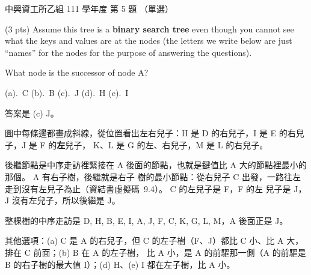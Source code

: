 \begin{pastexam}[label={px:nchu-111-is-05}]{中興資工所乙組 111 學年度 第 5 題}
（單選）

(3 pts) Assume this tree is a \textbf{binary search tree} even though you cannot see what the keys and values
are at the nodes (the letters we write below are just ``names'' for the nodes for the purpose of answering the
questions).

\begin{center}
\end{center}

What node is the successor of node A?

(a).~C \qquad (b).~B \qquad (c).~J \qquad (d).~H \qquad (e).~I
\end{pastexam}

\begin{pastsoln}
答案是 (c) J。

圖中每條邊都畫成斜線，從位置看出左右兒子：H 是 D 的右兒子，I 是 E 的右兒子，J 是 F 的\textbf{左}兒子，
K、L 是 G 的左、右兒子，M 是 L 的右兒子。

後繼節點是中序走訪裡緊接在 A 後面的節點，也就是鍵值比 A 大的節點裡最小的那個。 A 有右子樹，後繼就是右子
樹的最小節點：從右兒子 C 出發，一路往左走到沒有左兒子為止（資結書虛擬碼~9.4）。 C 的左兒子是 F，F 的左
兒子是 J，J 沒有左兒子，所以後繼是 J。

整棵樹的中序走訪是 D, H, B, E, I, A, J, F, C, K, G, L, M，A 後面正是 J。

其他選項：(a) C 是 A 的右兒子，但 C 的左子樹（F、J）都比 C 小、比 A 大，排在 C 前面；(b) B 在 A 的左子樹，
比 A 小，是 A 的前驅那一側（A 的前驅是 B 的右子樹的最大值 I）；(d) H、(e) I 都在左子樹，比 A 小。
\end{pastsoln}
